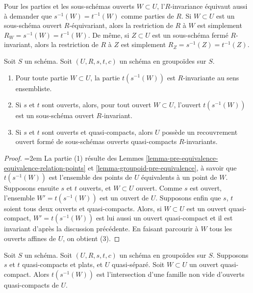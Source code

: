 \noindent
Pour les parties et les sous-schémas ouverts $W \subset U$, l'$R$-invariance
équivaut aussi à demander que $s^{-1}(W) = t^{-1}(W)$
comme parties de $R$. Si $W \subset U$ est un sous-schéma ouvert $R$-équivariant,
alors la restriction de $R$ à $W$ est simplement $R_W = s^{-1}(W) = t^{-1}(W)$.
De même, si $Z \subset U$ est un sous-schéma fermé $R$-invariant, alors
la restriction de $R$ à $Z$ est simplement $R_Z = s^{-1}(Z) = t^{-1}(Z)$.

\begin{lemma}
\label{lemma-constructing-invariant-opens}
Soit $S$ un schéma.
Soit $(U, R, s, t, c)$ un schéma en groupoïdes sur $S$.
\begin{enumerate}
\item Pour toute partie $W \subset U$, la partie $t(s^{-1}(W))$
est $R$-invariante au sens ensembliste.
\item Si $s$ et $t$ sont ouverts, alors, pour tout ouvert $W \subset U$,
l'ouvert $t(s^{-1}(W))$ est un sous-schéma ouvert $R$-invariant.
\item Si $s$ et $t$ sont ouverts et quasi-compacts, alors $U$ possède un
recouvrement ouvert formé de sous-schémas ouverts quasi-compacts $R$-invariants.
\end{enumerate}
\end{lemma}

\begin{proof}
{\emergencystretch=2em La partie (1) résulte des
Lemmes \ref{lemma-pre-equivalence-equivalence-relation-points} et
\ref{lemma-groupoid-pre-equivalence}, à savoir que $t(s^{-1}(W))$
est l'ensemble des points de $U$ équivalents à un point de $W$.
Supposons ensuite $s$ et $t$ ouverts, et $W \subset U$ ouvert.
Comme $s$ est ouvert, l'ensemble $W' = t(s^{-1}(W))$ est un ouvert de $U$.
Supposons enfin que $s$, $t$ soient tous deux ouverts et quasi-compacts.
Alors, si $W \subset U$ est un ouvert quasi-compact,
$W' = t(s^{-1}(W))$ est lui aussi un ouvert quasi-compact et il est invariant d'après la
discussion précédente. En faisant parcourir à $W$ tous les ouverts affines de $U$,
on obtient (3).\par}
\end{proof}

\begin{lemma}
\label{lemma-first-observation}
Soit $S$ un schéma. Soit $(U, R, s, t, c)$ un schéma en groupoïdes sur $S$.
Supposons $s$ et $t$ quasi-compacts et plats, et $U$ quasi-séparé.
Soit $W \subset U$ un ouvert quasi-compact. Alors $t(s^{-1}(W))$
est l'intersection d'une famille non vide d'ouverts quasi-compacts de $U$.
\end{lemma}

